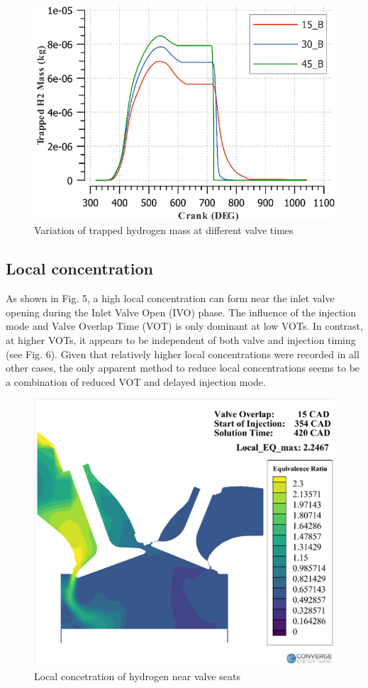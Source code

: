 \documentclass[conference]{IEEEtran}
\begin{document}
\begin{figure}[htbp]
    \centerline{\includegraphics{plots and graphs/4.png}}
    \caption{Variation of trapped hydrogen mass at different valve times}
    \label{plt_4}
    \end{figure}

\subsection{Local concentration}
As shown in Fig. 5, a high local concentration can form near the inlet valve opening during the Inlet Valve Open (IVO) phase. The influence of the injection mode and Valve Overlap Time (VOT) is only dominant at low VOTs. In contrast, at higher VOTs, it appears to be independent of both valve and injection timing (see Fig. 6). Given that relatively higher local concentrations were recorded in all other cases, the only apparent method to reduce local concentrations seems to be a combination of reduced VOT and delayed injection mode.

\begin{figure}[htbp]
    \centerline{\includegraphics{plots and graphs/5.png}}
    \caption{Local concetration of hydrogen near valve seats}
    \label{plt_5}
    \end{figure}
\end{document}
